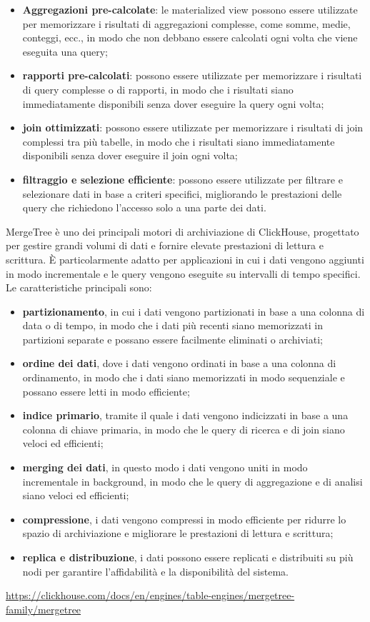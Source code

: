 \begin{itemize}
	\item \textbf{Aggregazioni pre-calcolate}: le materialized view possono essere utilizzate per memorizzare i risultati di aggregazioni complesse, come somme, medie, conteggi, ecc., in modo che non debbano essere calcolati ogni volta che viene eseguita una query;
	\item \textbf{rapporti pre-calcolati}: possono essere utilizzate per memorizzare i risultati di query complesse o di rapporti, in modo che i risultati siano immediatamente disponibili senza dover eseguire la query ogni volta;
	\item \textbf{join ottimizzati}: possono essere utilizzate per memorizzare i risultati di join complessi tra più tabelle, in modo che i risultati siano immediatamente disponibili senza dover eseguire il join ogni volta;
	\item \textbf{filtraggio e selezione efficiente}: possono essere utilizzate per filtrare e selezionare dati in base a criteri specifici, migliorando le prestazioni delle query che richiedono l'accesso solo a una parte dei dati.
\end{itemize}
MergeTree è uno dei principali motori di archiviazione di ClickHouse, progettato per gestire grandi volumi di dati e fornire elevate prestazioni di lettura e scrittura. È particolarmente adatto per applicazioni in cui i dati vengono aggiunti in modo incrementale e le query vengono eseguite su intervalli di tempo specifici.
Le caratteristiche principali sono:
\begin{itemize}
	\item \textbf{partizionamento}, in cui i dati vengono partizionati in base a una colonna di data o di tempo, in modo che i dati più recenti siano memorizzati in partizioni separate e possano essere facilmente eliminati o archiviati;
	\item \textbf{ordine dei dati}, dove i dati vengono ordinati in base a una colonna di ordinamento, in modo che i dati siano memorizzati in modo sequenziale e possano essere letti in modo efficiente;
	\item \textbf{indice primario}, tramite il quale i dati vengono indicizzati in base a una colonna di chiave primaria, in modo che le query di ricerca e di join siano veloci ed efficienti;
	\item \textbf{merging dei dati}, in questo modo i dati vengono uniti in modo incrementale in background, in modo che le query di aggregazione e di analisi siano veloci ed efficienti;
	\item \textbf{compressione}, i dati vengono compressi in modo efficiente per ridurre lo spazio di archiviazione e migliorare le prestazioni di lettura e scrittura;
	\item \textbf{replica e distribuzione}, i dati possono essere replicati e distribuiti su più nodi per garantire l'affidabilità e la disponibilità del sistema.
\end{itemize}
\url{https://clickhouse.com/docs/en/engines/table-engines/mergetree-family/mergetree}

